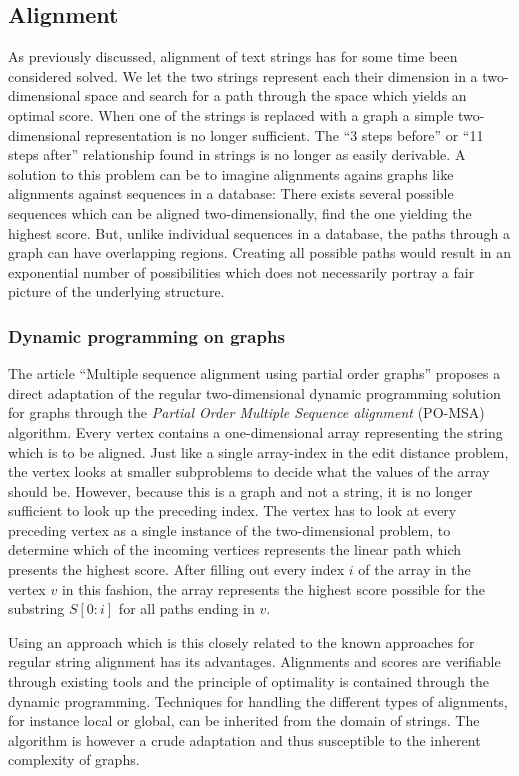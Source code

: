 \documentclass[thesis.tex]{subfiles}
\begin{document}
\subsection{Alignment}
As previously discussed, alignment of text strings has for some time been considered solved. We let the two strings represent each their dimension in a two-dimensional space and search for a path through the space which yields an optimal score. When one of the strings is replaced with a graph a simple two-dimensional representation is no longer sufficient. The ``3 steps before'' or ``11 steps after'' relationship found in strings is no longer as easily derivable. A solution to this problem can be to imagine alignments agains graphs like alignments against sequences in a database: There exists several possible sequences which can be aligned two-dimensionally, find the one yielding the highest score. But, unlike individual sequences in a database, the paths through a graph can have overlapping regions. Creating all possible paths would result in an exponential number of possibilities which does not necessarily portray a fair picture of the underlying structure.
\subsubsection{Dynamic programming on graphs}
\label{sec:dp_on_graphs}
The article ``Multiple sequence alignment using partial order graphs'' \cite{multiple_sequence_alignment_using_partial_order_graphs} proposes a direct adaptation of the regular two-dimensional dynamic programming solution for graphs through the \textit{Partial Order Multiple Sequence alignment} (PO-MSA) algorithm. Every vertex contains a one-dimensional array representing the string which is to be aligned. Just like a single array-index in the edit distance problem, the vertex looks at smaller subproblems to decide what the values of the array should be. However, because this is a graph and not a string, it is no longer sufficient to look up the preceding index. The vertex has to look at every preceding vertex as a single instance of the two-dimensional problem, to determine which of the incoming vertices represents the linear path which presents the highest score. After filling out every index $i$ of the array in the vertex $v$ in this fashion, the array represents the highest score possible for the substring $S[0:i]$ for all paths ending in $v$.\\
\par\noindent
Using an approach which is this closely related to the known approaches for regular string alignment has its advantages. Alignments and scores are verifiable through existing tools and the principle of optimality is contained through the dynamic programming. Techniques for handling the different types of alignments, for instance local or global, can be inherited from the domain of strings. The algorithm is however a crude adaptation and thus susceptible to the inherent complexity of graphs.
\label{sec:po_msa}
\end{document}
